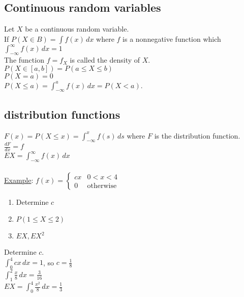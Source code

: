   \subsection*{Continuous random variables}
    Let $X$ be a continuous random variable.\\
    If $P(X \in B) = \int f(x)\,dx$ where $f$ is a nonnegative function which
    $\int_{-\infty}^{\infty} f(x)\,dx = 1$\\
    The function $f = f_X$ is called the density of $X$.\\
    $P(X \in [a,b]) = P(a \le X \le b)$\\
    $P(X = a) = 0$\\
    $P(X \le a) = \int_{-\infty}^a f(x)\,dx = P(X < a)$.\\

  \subsection*{distribution functions}
    $F(x) = P(X \le x) = \int_{-\infty}^x f(s)\,ds$ where $F$ is the 
    distribution function.\\
    $\frac{dF}{dx} = f$\\
    $EX = \int_{-\infty}^{\infty}f(x)\,dx$\\\\
    \underline{Example}: $f(x) = \begin{cases} cx & 0 < x < 4\\ 0 & 
      \text{otherwise} \end{cases}$\\
    \begin{enumerate}
      \item Determine $c$
      \item $P(1 \le X \le 2)$
      \item $EX, EX^2$
    \end{enumerate}
    Determine $c$.\\
    $\int_0^4 cx\,dx = 1$, so $c = \frac{1}{8}$\\
    $\int_1^2 \frac{x}{8}\,dx = \frac{3}{16}$\\
    $EX = \int_0^4 \frac{x^2}{8}\,dx = \frac{1}{3}$\\
